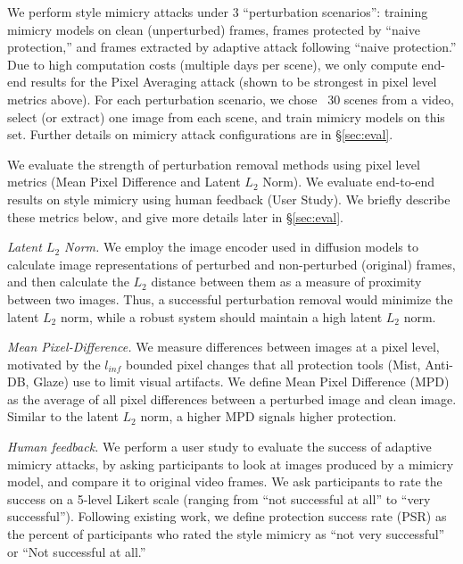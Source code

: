  We perform style mimicry attacks under 3
``perturbation scenarios'': training mimicry models on 
clean (unperturbed) frames, frames protected by ``naive protection,'' and
frames extracted by adaptive attack following ``naive protection.''  Due to
high computation costs (multiple days per scene), we only compute end-end
results for the Pixel Averaging attack (shown to be strongest in pixel level
metrics above).
For each perturbation scenario, we chose ~30
scenes from a video, select (or extract) one image from each scene,
and train mimicry models on this set.  Further details on mimicry attack
configurations are in \S\ref{sec:eval}.

  We evaluate the strength of perturbation removal
methods using pixel level metrics (Mean Pixel Difference and Latent $L_2$ Norm). 
We evaluate end-to-end results on style mimicry using human feedback
(User Study). We briefly describe these metrics below, and give more details later in
\S\ref{sec:eval}.

\begin{packed_itemize}
\item{\em Latent $L_2$ Norm.} We employ the image encoder used in diffusion models
  to calculate image representations of perturbed and non-perturbed (original)
  frames, and then calculate the $L_2$ distance between them as a measure
  of proximity between two images. Thus, a successful perturbation removal
  would minimize the latent $L_2$ norm, while a robust system should maintain a
  high latent $L_2$ norm.

\item{\em Mean Pixel-Difference.}  We measure differences between images at a
  pixel level, motivated by the $l_{inf}$ bounded pixel changes that all
  protection tools (Mist, Anti-DB, Glaze) use to limit visual artifacts. We
  define Mean Pixel Difference (MPD) as the average of all pixel differences
  between a perturbed image and clean image. Similar to the latent $L_2$ norm, 
  a higher MPD signals higher protection.

\item{\em Human feedback.}  We perform a user study to evaluate the success
  of adaptive mimicry attacks, by asking participants to look at images
  produced by a mimicry model, and compare it to original video frames.  We
  ask participants to rate the success on a 5-level Likert scale (ranging
  from ``not successful at all'' to ``very successful''). Following existing
  work, we define protection success rate (PSR) as the percent of
  participants who rated the style mimicry as ``not very successful'' or
  ``Not successful at all.''
\end{packed_itemize}

